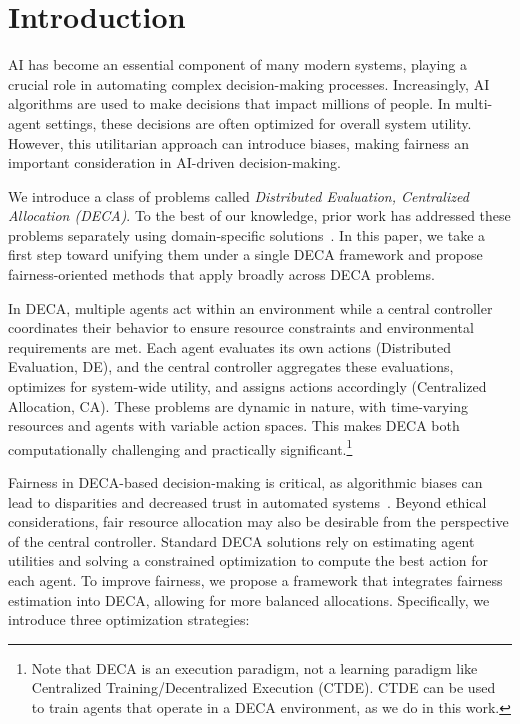 
\section{Introduction}

\label{sec:intro}

AI has become an essential component of many modern systems, playing a crucial role in automating complex decision-making processes. Increasingly, AI algorithms are used to make decisions that impact millions of people. In multi-agent settings, these decisions are often optimized for overall system utility. However, this utilitarian approach can introduce biases, making fairness an important consideration in AI-driven decision-making.

We introduce a class of problems called \emph{Distributed Evaluation, Centralized Allocation (DECA)}. To the best of our knowledge, prior work has addressed these problems separately using domain-specific solutions~\citep{shah2020neural, qin2022RLforRides,kube2019allocating, kube2023community}. In this paper, we take a first step toward unifying them under a single DECA framework and propose fairness-oriented methods that apply broadly across DECA problems.

In DECA, multiple agents act within an environment while a central controller coordinates their behavior to ensure resource constraints and environmental requirements are met. Each agent evaluates its own actions (Distributed Evaluation, DE), and the central controller aggregates these evaluations, optimizes for system-wide utility, and assigns actions accordingly (Centralized Allocation, CA). These problems are dynamic in nature, 
with time-varying resources and agents with variable action spaces. 
This makes DECA both computationally challenging and practically significant.\footnote{
Note that DECA is an execution paradigm, not a learning paradigm like Centralized Training/Decentralized Execution (CTDE). CTDE can be used to train agents that operate in a DECA environment, as we do in this work.
}

Fairness in DECA-based decision-making is critical, as algorithmic biases can lead to disparities and decreased trust in automated systems~\citep{mehrabi2021MLBiassurvey}. Beyond ethical considerations, fair resource allocation may also be desirable from the perspective of the central controller. Standard DECA solutions rely on estimating agent utilities and solving a constrained optimization to compute the best action for each agent. To improve fairness, we propose a framework that integrates fairness estimation into DECA, allowing for more balanced allocations. Specifically, we introduce three optimization strategies:

